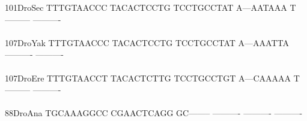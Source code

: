 \documentclass[11pt,twoside,reqno,a4paper]{article}
\begin{document}
{101\hspace*{2\charwidth}DroSec	TTTGTAACCC	TACACTCCTG	TCCTGCCTAT	A---AATAAA	T---------	----------	\\
\hspace*{5\charwidth}\hspace*{7\charwidth}\hspace*{1\charwidth}\hspace*{1\charwidth}\hspace*{1\charwidth}\hspace*{1\charwidth}\hspace*{1\charwidth}\hspace*{1\charwidth}\\
107\hspace*{2\charwidth}DroYak	TTTGTAACCC	TACACTCCTG	TCCTGCCTAT	A---AAATTA	----------	----------	\\
\hspace*{5\charwidth}\hspace*{7\charwidth}\hspace*{1\charwidth}\hspace*{1\charwidth}\hspace*{1\charwidth}\hspace*{1\charwidth}\hspace*{1\charwidth}\hspace*{1\charwidth}\\
107\hspace*{2\charwidth}DroEre	TTTGTAACCT	TACACTCTTG	TCCTGCCTGT	A---CAAAAA	T---------	----------	\\
\hspace*{5\charwidth}\hspace*{7\charwidth}\hspace*{1\charwidth}\hspace*{1\charwidth}\hspace*{1\charwidth}\hspace*{1\charwidth}\hspace*{1\charwidth}\hspace*{1\charwidth}\\
88\hspace*{3\charwidth}DroAna	TGCAAAGGCC	CGAACTCAGG	GC--------	----------	----------	----------	\\
\hspace*{5\charwidth}\hspace*{7\charwidth}\hspace*{1\charwidth}\hspace*{1\charwidth}\hspace*{1\charwidth}\hspace*{1\charwidth}\hspace*{1\charwidth}\hspace*{1\charwidth}\\
}
\end{document}
